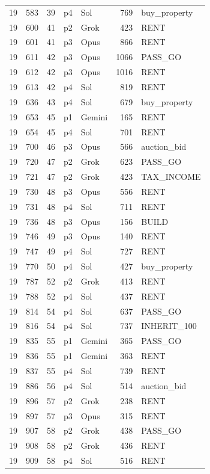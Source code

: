 \begin{longtable}{r r r l l r L{2.2in}}
19 & 583 & 39 & p4 & Sol & 769 & buy\_property \\
19 & 600 & 41 & p2 & Grok & 423 & RENT \\
19 & 601 & 41 & p3 & Opus & 866 & RENT \\
19 & 611 & 42 & p3 & Opus & 1066 & PASS\_GO \\
19 & 612 & 42 & p3 & Opus & 1016 & RENT \\
19 & 613 & 42 & p4 & Sol & 819 & RENT \\
19 & 636 & 43 & p4 & Sol & 679 & buy\_property \\
19 & 653 & 45 & p1 & Gemini & 165 & RENT \\
19 & 654 & 45 & p4 & Sol & 701 & RENT \\
19 & 700 & 46 & p3 & Opus & 566 & auction\_bid \\
19 & 720 & 47 & p2 & Grok & 623 & PASS\_GO \\
19 & 721 & 47 & p2 & Grok & 423 & TAX\_INCOME \\
19 & 730 & 48 & p3 & Opus & 556 & RENT \\
19 & 731 & 48 & p4 & Sol & 711 & RENT \\
19 & 736 & 48 & p3 & Opus & 156 & BUILD \\
19 & 746 & 49 & p3 & Opus & 140 & RENT \\
19 & 747 & 49 & p4 & Sol & 727 & RENT \\
19 & 770 & 50 & p4 & Sol & 427 & buy\_property \\
19 & 787 & 52 & p2 & Grok & 413 & RENT \\
19 & 788 & 52 & p4 & Sol & 437 & RENT \\
19 & 814 & 54 & p4 & Sol & 637 & PASS\_GO \\
19 & 816 & 54 & p4 & Sol & 737 & INHERIT\_100 \\
19 & 835 & 55 & p1 & Gemini & 365 & PASS\_GO \\
19 & 836 & 55 & p1 & Gemini & 363 & RENT \\
19 & 837 & 55 & p4 & Sol & 739 & RENT \\
19 & 886 & 56 & p4 & Sol & 514 & auction\_bid \\
19 & 896 & 57 & p2 & Grok & 238 & RENT \\
19 & 897 & 57 & p3 & Opus & 315 & RENT \\
19 & 907 & 58 & p2 & Grok & 438 & PASS\_GO \\
19 & 908 & 58 & p2 & Grok & 436 & RENT \\
19 & 909 & 58 & p4 & Sol & 516 & RENT \\

\end{longtable}
